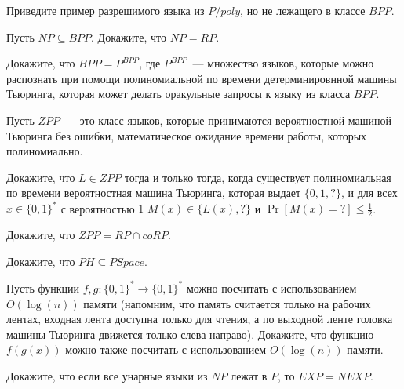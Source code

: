 \setcounter{curtask}{50}


\begin{task}
    Приведите пример разрешимого языка из $P/poly$, но не лежащего в классе $BPP$.
\end{task}

\begin{task}
    Пусть $NP \subseteq BPP$. Докажите, что $NP = RP$.
\end{task}

\begin{task}
    Докажите, что $BPP = P^{BPP}$, где $P^{BPP}$~--- множество языков, которые можно распознать при помощи полиномиальной по
    времени детерминировнной машины Тьюринга, которая может делать оракульные запросы к языку из класса $BPP$.
\end{task}


Пусть $ZPP$~--- это класс языков, которые принимаются вероятностной машиной Тьюринга
без ошибки, математическое ожидание времени работы, которых полиномиально.

\begin{task}
	Докажите, что $L \in ZPP$ тогда и только тогда, когда существует полиномиальная по времени вероятностная машина Тьюринга,
    которая выдает $\{0, 1, ?\}$, и для всех $x \in \{0, 1\}^*$ с вероятностью $1$ $M(x) \in \{L(x), ?\}$ и $\Pr[M(x) = ?] \le
    \frac{1}{2}$.
\end{task}

\begin{task}
	Докажите, что $ZPP = RP \cap coRP$.
\end{task}


\breakline

\begin{ptask}{39}
    Докажите, что $PH \subseteq PSpace$.
\end{ptask}

\begin{ptask}{41}
    Пусть функции $f, g: \{0, 1\}^* \rightarrow \{0, 1\}^*$ можно посчитать с
    использованием $O(\log(n))$ памяти (напомним, что память считается только на
    рабочих лентах, входная лента доступна только для чтения, а по выходной ленте
    головка машины Тьюринга движется только слева направо). Докажите, что функцию
    $f(g(x))$ можно также посчитать с использованием $O(\log(n))$ памяти.
\end{ptask}

\begin{ptask}{43}
	Докажите, что если все унарные языки из $NP$ лежат в $P$, то $EXP = NEXP$.
\end{ptask}

